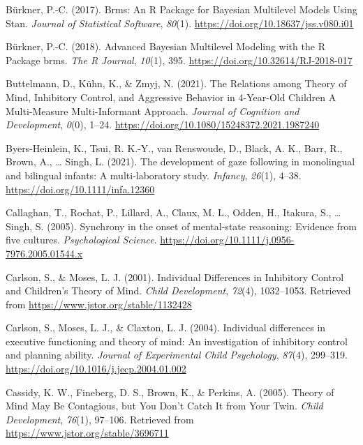 \documentclass[
  man,floatsintext]{apa7}
\newlength{\cslhangindent}
\newlength{\cslentryspacingunit} %
\newenvironment{CSLReferences}[2] %
 {%
  \setlength{\parindent}{0pt}
  \ifodd #1
  \let\oldpar\par
  \def\par{\hangindent=\cslhangindent\oldpar}
  \fi
  \setlength{\parskip}{#2\cslentryspacingunit}
 }%
 {}
\begin{document}
\begin{CSLReferences}{1}{0}
\leavevmode{}%
Bürkner, P.-C. (2017). Brms: {An R Package} for {Bayesian Multilevel Models Using Stan}. \emph{Journal of Statistical Software}, \emph{80}(1). \url{https://doi.org/10.18637/jss.v080.i01}

\leavevmode{}%
Bürkner, P.-C. (2018). Advanced {Bayesian Multilevel Modeling} with the {R Package} brms. \emph{The R Journal}, \emph{10}(1), 395. \url{https://doi.org/10.32614/RJ-2018-017}

\leavevmode{}%
Buttelmann, D., Kühn, K., \& Zmyj, N. (2021). The {Relations} among {Theory} of {Mind}, {Inhibitory Control}, and {Aggressive Behavior} in 4-{Year-Old Children} \textendash{} {A Multi-Measure Multi-Informant Approach}. \emph{Journal of Cognition and Development}, \emph{0}(0), 1--24. \url{https://doi.org/10.1080/15248372.2021.1987240}

\leavevmode{}%
Byers-Heinlein, K., Tsui, R. K.-Y., van Renswoude, D., Black, A. K., Barr, R., Brown, A., \ldots{} Singh, L. (2021). The development of gaze following in monolingual and bilingual infants: {A} multi-laboratory study. \emph{Infancy}, \emph{26}(1), 4--38. \url{https://doi.org/10.1111/infa.12360}

\leavevmode{}%
Callaghan, T., Rochat, P., Lillard, A., Claux, M. L., Odden, H., Itakura, S., \ldots{} Singh, S. (2005). Synchrony in the onset of mental-state reasoning: {Evidence} from five cultures. \emph{Psychological Science}. \url{https://doi.org/10.1111/j.0956-7976.2005.01544.x}

\leavevmode{}%
Carlson, S., \& Moses, L. J. (2001). Individual {Differences} in {Inhibitory Control} and {Children}'s {Theory} of {Mind}. \emph{Child Development}, \emph{72}(4), 1032--1053. Retrieved from \url{https://www.jstor.org/stable/1132428}

\leavevmode{}%
Carlson, S., Moses, L. J., \& Claxton, L. J. (2004). Individual differences in executive functioning and theory of mind: {An} investigation of inhibitory control and planning ability. \emph{Journal of Experimental Child Psychology}, \emph{87}(4), 299--319. \url{https://doi.org/10.1016/j.jecp.2004.01.002}

\leavevmode{}%
Cassidy, K. W., Fineberg, D. S., Brown, K., \& Perkins, A. (2005). Theory of {Mind May Be Contagious}, but {You Don}'t {Catch It} from {Your Twin}. \emph{Child Development}, \emph{76}(1), 97--106. Retrieved from \url{https://www.jstor.org/stable/3696711}


\end{CSLReferences}
\end{document}
